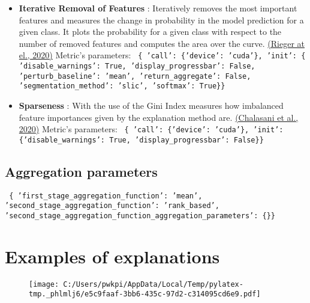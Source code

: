 \documentclass{article}%
\begin{document}
\begin{itemize}
{                'perturb\_radius': 0.2,\newline%
                'similarity\_func': difference\}\} \newline%
%
}%
\item%
\textbf{Iterative Removal of Features}%
: Iteratively removes the most important features and measures the change in probability in the model prediction for a given class. It plots the probability for a given class with respect to the number of removed features and computes the area over the curve.%
\href{https://arxiv.org/abs/2003.08747}{(Rieger at el., 2020)}%
\newline%
%
Metric's parameters: \newline%
%
\texttt{%
\{   'call': \{'device': 'cuda'\},\newline%
    'init': \{   'disable\_warnings': True,\newline%
                'display\_progressbar': False,\newline%
                'perturb\_baseline': 'mean',\newline%
                'return\_aggregate': False,\newline%
                'segmentation\_method': 'slic',\newline%
                'softmax': True\}\} \newline%
%
}%
\item%
\textbf{Sparseness}%
: With the use of the Gini Index measures how imbalanced feature importances given by the explanation method are.%
\href{https://arxiv.org/abs/1810.06583}{(Chalasani et al., 2020)}%
\newline%
%
Metric's parameters: \newline%
%
\texttt{%
\{   'call': \{'device': 'cuda'\},\newline%
    'init': \{'disable\_warnings': True, 'display\_progressbar': False\}\} \newline%
%
}%
\end{itemize}

%
\subsection*{Aggregation parameters}%
\label{subsec:Aggregationparameters}%
\texttt{%
\{   'first\_stage\_aggregation\_function': 'mean',\newline%
    'second\_stage\_aggregation\_function': 'rank\_based',\newline%
    'second\_stage\_aggregation\_function\_aggregation\_parameters': \{\}\}%
}

%
\newpage%
\section*{Examples of explanations}%
\label{sec:Examplesofexplanations}%


\begin{figure}[!h]%
\centering%
\texttt{[image: C:/Users/pwkpi/AppData/Local/Temp/pylatex-tmp.\_phlmlj6/e5c9faaf-3bb6-435c-97d2-c314095cd6e9.pdf]}%
\end{figure}

%
\end{document}
